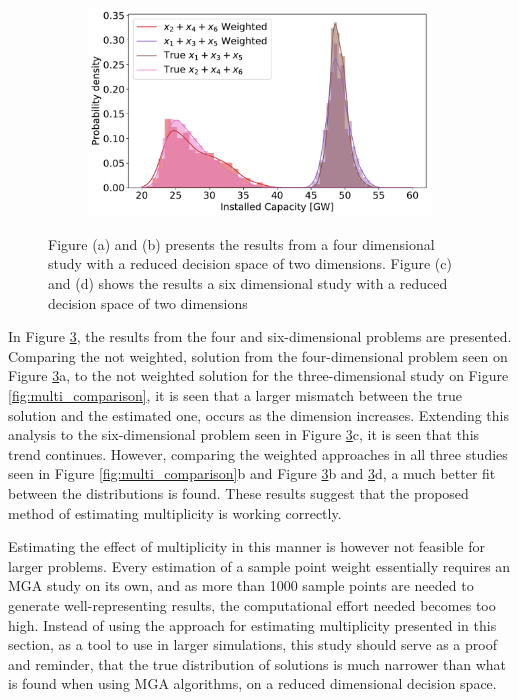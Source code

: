 \begin{figure}[hb]
\begin{subfigure}{.5\textwidth}
		\caption{}
		\label{fig:multi_6D_1}
	\end{subfigure}%
	\begin{subfigure}{.5\textwidth}
		\centering
		\includegraphics[width=1.\textwidth]{./Images/multi_6D_2}
		\caption{}
		\label{fig:multi_6D_2}
	\end{subfigure}
	\caption{Figure (a) and (b) presents the results from a four dimensional study with a reduced decision space of two dimensions. Figure (c) and (d) shows the results a six dimensional study with a reduced decision space of two dimensions}
	\label{fig:multi_46D}
\end{figure}

In Figure \ref{fig:multi_46D}, the results from the four and six-dimensional problems are presented. Comparing the not weighted, solution from the four-dimensional problem seen on Figure \ref{fig:multi_46D}a, to the not weighted solution for the three-dimensional study on Figure \ref{fig:multi_comparison}, it is seen that a larger mismatch between the true solution and the estimated one, occurs as the dimension increases. Extending this analysis to the six-dimensional problem seen in Figure \ref{fig:multi_46D}c, it is seen that this trend continues. 
However, comparing the weighted approaches in all three studies seen in Figure \ref{fig:multi_comparison}b and Figure \ref{fig:multi_46D}b and \ref{fig:multi_46D}d, a much better fit between the distributions is found. These results suggest that the proposed method of estimating multiplicity is working correctly. 


Estimating the effect of multiplicity in this manner is however not feasible for larger problems. Every estimation of a sample point weight essentially requires an MGA study on its own, and as more than 1000 sample points are needed to generate well-representing results, the computational effort needed becomes too high. Instead of using the approach for estimating multiplicity presented in this section, as a tool to use in larger simulations, this study should serve as a proof and reminder, that the true distribution of solutions is much narrower than what is found when using MGA algorithms, on a reduced dimensional decision space. 


